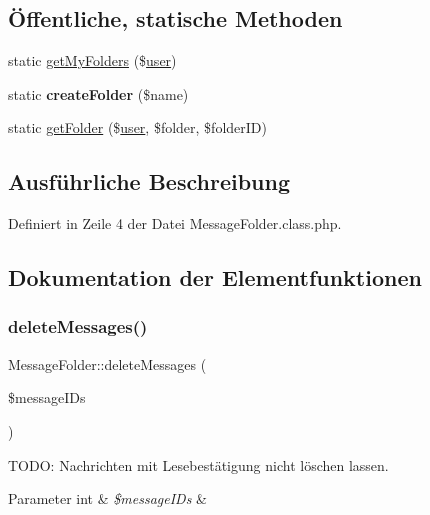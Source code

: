 \subsection*{Öffentliche, statische Methoden}
\begin{DoxyCompactItemize}
\item 
static \mbox{\hyperlink{class_message_folder_a59eef48eb10e6fb6b004d8a82098b957}{get\+My\+Folders}} (\$\mbox{\hyperlink{classuser}{user}})
\item 
\mbox{\label{class_message_folder_ac1a2f7efcb468a964599985c9eb80431}} 
static {\bfseries create\+Folder} (\$name)
\item 
static \mbox{\hyperlink{class_message_folder_ac7969e79fb16a5a531e0caa99ceac307}{get\+Folder}} (\$\mbox{\hyperlink{classuser}{user}}, \$folder, \$folder\+ID)
\end{DoxyCompactItemize}


\subsection{Ausführliche Beschreibung}


Definiert in Zeile 4 der Datei Message\+Folder.\+class.\+php.



\subsection{Dokumentation der Elementfunktionen}
\mbox{\label{class_message_folder_a33202c1c3c693ab579c53fca35e69862}} 
\subsubsection{\texorpdfstring{delete\+Messages()}{deleteMessages()}}
{\footnotesize\ttfamily Message\+Folder\+::delete\+Messages (\begin{DoxyParamCaption}\item[{}]{\$message\+I\+Ds }\end{DoxyParamCaption})}

T\+O\+DO\+: Nachrichten mit Lesebestätigung nicht löschen lassen. 
\begin{DoxyParams}[1]{Parameter}
int & {\em \$message\+I\+Ds} & \\
\hline
\end{DoxyParams}


